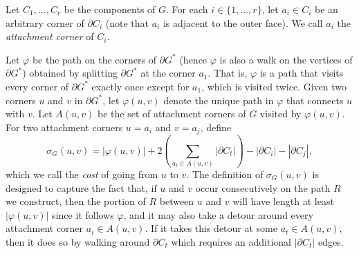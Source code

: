 \documentclass[11pt]{patmorin}
\begin{document}
Let $C_1, \ldots, C_r$ be the components of $G$.
For each $i\in \{1,\dots,r\}$, let $a_i\in C_i$ be an arbitrary corner of $\partial C_i$ (note that $a_i$ is adjacent to the outer face).
We call $a_i$ the \emph{attachment corner} of $C_i$.

Let $\varphi$ be the path on the corners of $\partial G^*$ (hence $\varphi$ is also a walk on the vertices of $\partial G^*$) obtained by splitting $\partial G^*$ at the corner $a_1$. That is, $\varphi$ is a path that visits every corner of $\partial G^*$ exactly once except for $a_1$, which is visited twice.
Given two corners $u$ and $v$ in $\partial G^*$, let $\varphi(u,v)$ denote
the unique path in $\varphi$ that connects $u$ with $v$. Let $A(u,v)$ be
the set of attachment corners of $G$ visited by $\varphi(u,v)$. For two attachment corners $u=a_i$ and $v=a_j$, define
\[
       \sigma_G(u,v) = |\varphi(u,v)| + 2\left (\sum_{a_t\in A(u,v)}|\partial C_t|\right)
           - |\partial C_i| - |\partial C_j| ,
\]
which we call the \emph{cost} of going from $u$ to $v$.  The definition of $\sigma_G(u,v)$ is designed to capture the fact that, if $u$ and $v$ occur consecutively on the path $R$ we construct, then the portion of $R$ between $u$ and $v$ will have length at least $|\varphi(u,v)|$ since it follows $\varphi$, and it may also take a detour around every attachment corner $a_i\in A(u,v)$.  If it takes this detour at some $a_t\in A(u,v)$, then it does so by walking around $\partial C_t$ which requires an additional $|\partial C_t|$ edges.
\end{document}

